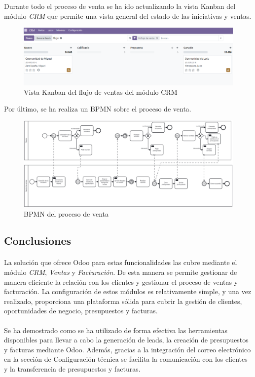 Durante todo el proceso de venta se ha ido actualizando la vista Kanban del módulo \textit{CRM} que permite una vista general del estado de las iniciativas y ventas.
\begin{figure}[h]
    \centering
    \includegraphics[width=1\linewidth]{fotosRelacion/kanban.png}
    \caption{Vista Kanban del flujo de ventas del módulo CRM}
    \label{fig:enter-label}
\end{figure}
Por último, se ha realiza un BPMN sobre el proceso de venta.
\begin{figure}[h]
    \centering
    \includegraphics[width=1\linewidth]{bpmn/venta.png}
    \caption{BPMN del proceso de venta}
    \label{fig:enter-label}
\end{figure}
\subsection{Conclusiones}
\paragraph{}
La solución que ofrece Odoo para estas funcionalidades las cubre mediante el módulo \textit{CRM}, \textit{Ventas} y \textit{Facturación}. De esta manera se permite gestionar de manera eficiente la relación con los clientes y gestionar el proceso de ventas y facturación. La configuración de estos módulos es relativamente simple, y una vez realizado, proporciona una plataforma sólida para cubrir la gestión de clientes, oportunidades de negocio, presupuestos y facturas.
\paragraph{}
Se ha demostrado como se ha utilizado de forma efectiva las herramientas disponibles para llevar a cabo la generación de leads, la creación de presupuestos y facturas mediante Odoo. Además, gracias a la integración del correo electrónico en la sección de Configuración técnica se facilita la comunicación con los clientes y la transferencia de presupuestos y facturas.
